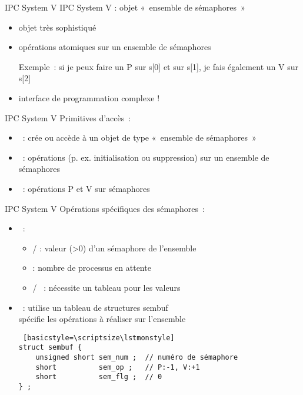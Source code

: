 
\begin {frame} {IPC System V}
    IPC System V : objet «~ensemble de sémaphores~»

    \vspace* {3mm}

    \begin {itemize}
	\item objet très sophistiqué
	\item opérations atomiques sur un ensemble de sémaphores

	    Exemple~: si je peux faire un P sur s[0] et sur s[1],
	    je fais également un V sur s[2]

	\item \implique interface de programmation complexe !
    \end {itemize}

\end {frame}

\begin {frame} {IPC System V}
    Primitives d'accès~:

    \begin {itemize}
	\item {}~: crée ou accède à un objet de type
	    «~ensemble de sémaphores~»
	\item {}~: opérations (p. ex. initialisation ou
	    suppression) sur un ensemble de sémaphores

	    \vspace* {3mm}

	\item {}~: opérations P et V sur sémaphores
    \end {itemize}

\end {frame}


\begin {frame} [fragile] {IPC System V}
    Opérations spécifiques des sémaphores~:
    \begin {itemize}
	\item {}~:
	    \begin {itemize}
		\item {} /  : valeur (>0) d'un
		    sémaphore de l'ensemble
		\item {} : nombre de processus en attente
		\item {} / ~: nécessite
		    un tableau pour les valeurs
	    \end {itemize}
	\item {}~: utilise un tableau de structures \code
	    {sembuf} \\
	    \implique spécifie les opérations à réaliser sur l'ensemble

\begin {lstlisting} [basicstyle=\scriptsize\lstmonstyle]
struct sembuf {
    unsigned short sem_num ;  // numéro de sémaphore
    short          sem_op ;   // P:-1, V:+1
    short          sem_flg ;  // 0
} ;
\end{lstlisting}

    \end {itemize}

\end{frame}

